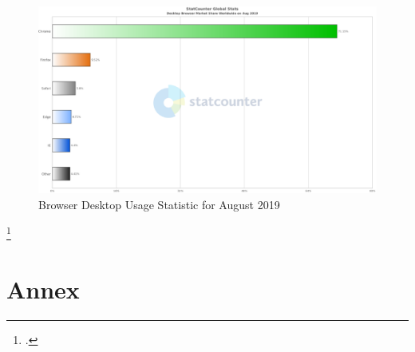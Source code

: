 \newpage

\begin{figure}[hbt]
	\centering
	\includegraphics[scale=0.48, keepaspectratio, angle=90]{pics/StatCounter-browser-ww-monthly-201908-201908-bar_desktop.eps}
	\caption[Browser Desktop Usage Statistics for August 2019]{Browser Desktop Usage Statistic for August 2019\footnotemark}
	\label{fig:stats-desktop}
\end{figure}
\footcitetext[Source][]{statcounter-desktop}

\chapter{Annex}


